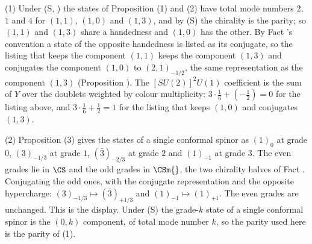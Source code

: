(1) Under (S, ) the states of Proposition (1) and (2) have total mode numbers $2$, $1$ and $4$ for $(1,1)$, $(1,0)$ and $(1,3)$, and by (S) the chirality is the parity; so $(1,1)$ and $(1,3)$ share a handedness and $(1,0)$ has the other. By Fact 's convention a state of the opposite handedness is listed as its conjugate, so the listing that keeps the component $(1,1)$ keeps the component $(1,3)$ and conjugates the component $(1,0)$ to $(2,1)_{-1/2}$, the same representation as the component $(1,3)$ (Proposition ). The $[SU(2)]^{2}U(1)$ coefficient is the sum of $Y$ over the doublets weighted by colour multiplicity: $3 \cdot \tfrac16 + (-\tfrac12) = 0$ for the listing above, and $3 \cdot \tfrac16 + \tfrac12 = 1$ for the listing that keeps $(1,0)$ and conjugates $(1,3)$.

(2) Proposition (3) gives the states of a single conformal spinor as $(1)_{0}$ at grade $0$, $(3)_{-1/3}$ at grade $1$, $(\bar{3})_{-2/3}$ at grade $2$ and $(1)_{-1}$ at grade $3$. The even grades lie in $\CS$ and the odd grades in $\CSm{}$, the two chirality halves of Fact . Conjugating the odd ones, with the conjugate representation and the opposite hypercharge: $(3)_{-1/3} \mapsto (\bar{3})_{+1/3}$ and $(1)_{-1} \mapsto (1)_{+1}$. The even grades are unchanged. This is the display. Under (S) the grade-$k$ state of a single conformal spinor is the $(0, k)$ component, of total mode number $k$, so the parity used here is the parity of (1).

